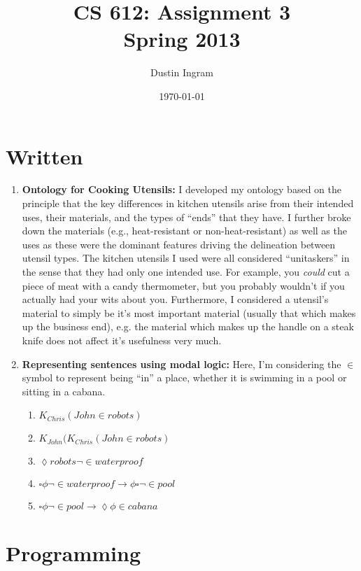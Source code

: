 \documentclass{article}
\title{CS 612: Assignment 3\\Spring 2013}
\author{Dustin Ingram}
\date{\today}
\begin{document}
\maketitle

\section*{Written}

\begin{enumerate}

\item{} %

\textbf{Ontology for Cooking Utensils:} I developed my ontology based on the
principle that the key differences in kitchen utensils arise from their intended
uses, their materials, and the types of ``ends'' that they have. I further broke
down the materials (e.g., heat-resistant or non-heat-resistant) as well as the
uses as these were the dominant features driving the delineation between utensil
types. The kitchen utensils I used were all considered ``unitaskers'' in the
sense that they had only one intended use. For example, you \emph{could} cut a
piece of meat with a candy thermometer, but you probably wouldn't if you
actually had your wits about you. Furthermore, I considered a utensil's material
to simply be it's most important material (usually that which makes up the
business end), e.g. the material which makes up the handle on a steak knife does
not affect it's usefulness very much.

\item{} %

\textbf{Representing sentences using modal logic:} 
Here, I'm considering the $\in$ symbol to represent being ``in'' a place,
whether it is swimming in a pool or sitting in a cabana.
\begin{enumerate}
    \item $K_{Chris}(John \in robots)$
    \item $K_{John}(K_{Chris}(John \in robots)$
    \item $\lozenge robots \neg \in waterproof$
    \item $\square \phi \neg \in waterproof \rightarrow \phi \square \neg \in pool$
    \item $\square \phi \neg \in pool \rightarrow \lozenge \phi \in cabana$ 
\end{enumerate}

\end{enumerate}

\section*{Programming}
\end{document}
